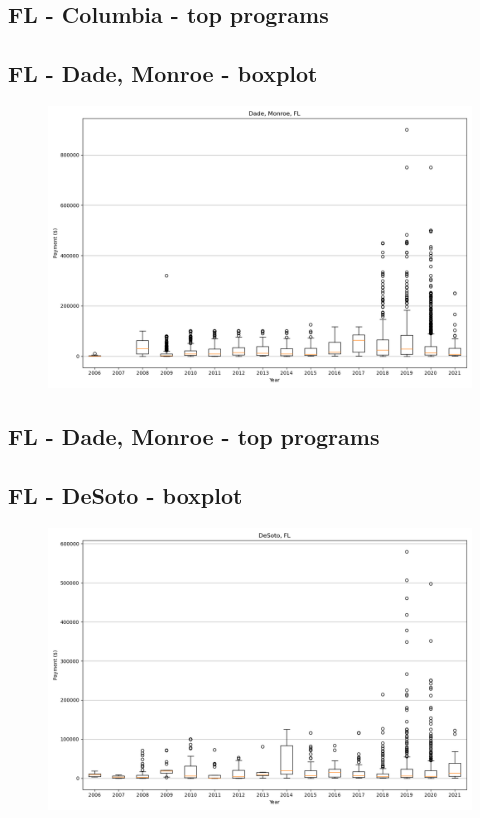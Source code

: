 \subsection*{FL - Columbia - top programs}

\newpage
\subsection*{FL - Dade, Monroe - boxplot}
\begin{figure}[h]
\centering
\includegraphics[width=7in]{../output/boxplots/counties/Dade, Monroe-FL_boxplot.png}
\end{figure}


\subsection*{FL - Dade, Monroe - top programs}

\newpage
\subsection*{FL - DeSoto - boxplot}
\begin{figure}[h]
\centering
\includegraphics[width=7in]{../output/boxplots/counties/DeSoto-FL_boxplot.png}
\end{figure}


